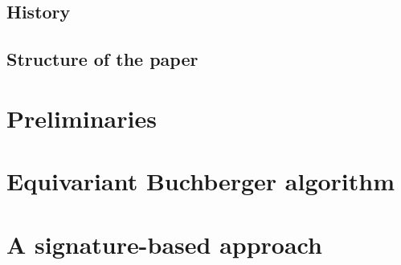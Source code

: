 \documentclass[11pt]{amsart}
\theoremstyle{definition}
\theoremstyle{remark}
\numberwithin{equation}{section}
\begin{document}


\subsection{History}



\subsection{Structure of the paper}

\section{Preliminaries}



\section{Equivariant Buchberger algorithm}



\section{A signature-based approach}\label{sec:signature}





\end{document}
